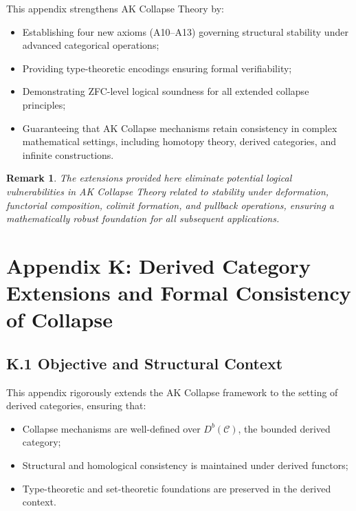 \documentclass[11pt]{article}
\newtheorem{remark}[theorem]{Remark}
\begin{document}
This appendix strengthens AK Collapse Theory by:

\begin{itemize}
    \item Establishing four new axioms (A10–A13) governing structural stability under advanced categorical operations;
    \item Providing type-theoretic encodings ensuring formal verifiability;
    \item Demonstrating ZFC-level logical soundness for all extended collapse principles;
    \item Guaranteeing that AK Collapse mechanisms retain consistency in complex mathematical settings, including homotopy theory, derived categories, and infinite constructions.
\end{itemize}

\begin{remark}
The extensions provided here eliminate potential logical vulnerabilities in AK Collapse Theory related to stability under deformation, functorial composition, colimit formation, and pullback operations, ensuring a mathematically robust foundation for all subsequent applications.
\end{remark}



\section*{Appendix K: Derived Category Extensions and Formal Consistency of Collapse}

\subsection*{K.1 Objective and Structural Context}

This appendix rigorously extends the AK Collapse framework to the setting of derived categories, ensuring that:

\begin{itemize}
    \item Collapse mechanisms are well-defined over \( D^b(\mathcal{C}) \), the bounded derived category;
    \item Structural and homological consistency is maintained under derived functors;
    \item Type-theoretic and set-theoretic foundations are preserved in the derived context.
\end{itemize}
\end{document}
